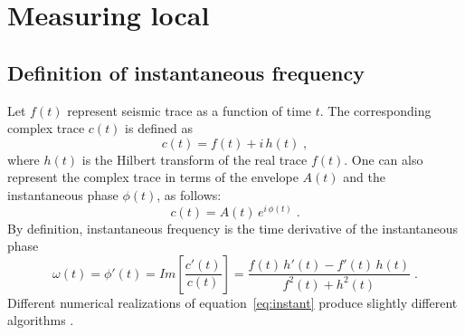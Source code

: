 \section{Measuring local  }


\subsection{Definition of instantaneous frequency}

Let $f(t)$ represent seismic trace as a function of time $t$. The
corresponding complex trace $c(t)$ is defined as
\begin{equation}
  \label{eq:complex}
  c(t) = f(t) + i\,h(t)\;,
\end{equation}
where $h(t)$ is the Hilbert transform of the real trace $f(t)$. One
can also represent the complex trace in terms of the envelope $A(t)$
and the instantaneous phase $\phi(t)$, as follows:
\begin{equation}
  \label{eq:polar}
  c(t) = A(t)\,e^{i\,\phi(t)}\;.
\end{equation}
By definition, instantaneous frequency is the time derivative of the
instantaneous phase \cite[]{GEO44-06-10411063}
\begin{equation}
  \label{eq:instant}
  \omega(t) = \phi'(t) = \mathit{Im}\left[\frac{c'(t)}{c(t)}\right]
  = \frac{f(t)\,h'(t) - f'(t)\,h(t)}{f^2(t) + h^2(t)}\;.
\end{equation}
Different numerical realizations of equation~\ref{eq:instant} produce
slightly different algorithms \cite[]{GEO57-11-15201524}.

